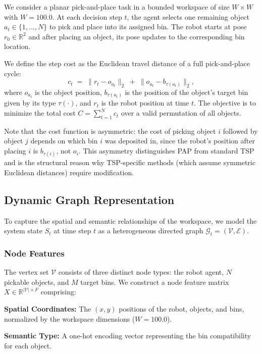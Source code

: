 \documentclass[conference]{IEEEtran}
\begin{document}
We consider a planar pick-and-place task in a bounded workspace of size $W \times W$ with $W = 100.0$. 
At each decision step $t$, the agent selects one remaining object $a_t \in \{1,\dots,N\}$ to pick and place into its assigned bin. 
The robot starts at pose $r_0 \in \mathbb{R}^2$ and after placing an object, its pose updates to the corresponding bin location.

We define the step cost as the Euclidean travel distance of a full pick-and-place cycle:
\begin{equation}
c_t \;=\; \lVert r_t - o_{a_t} \rVert_2 \;+\; \lVert o_{a_t} - b_{\tau(a_t)} \rVert_2,
\end{equation}
where $o_{a_t}$ is the object position, $b_{\tau(a_t)}$ is the position of the object's target bin given by its type $\tau(\cdot)$, and $r_t$ is the robot position at time $t$. 
The objective is to minimize the total cost $C = \sum_{t=1}^{N} c_t$ over a valid permutation of all objects.

Note that the cost function is asymmetric: the cost of picking object $i$ followed by object $j$ depends on which bin $i$ was deposited in, since the robot's position after placing $i$ is $b_{\tau(i)}$, not $o_i$. This asymmetry distinguishes PAP from standard TSP and is the structural reason why TSP-specific methods (which assume symmetric Euclidean distances) require modification.

\subsection{Dynamic Graph Representation}
To capture the spatial and semantic relationships of the workspace, we model the system state $S_t$ at time step $t$ as a heterogeneous directed graph $\mathcal{G}_t = (\mathcal{V}, \mathcal{E})$.

\subsubsection{Node Features}
The vertex set $\mathcal{V}$ consists of three distinct node types: the robot agent, $N$ pickable objects, and $M$ target bins. We construct a node feature matrix $X \in \mathbb{R}^{|\mathcal{V}| \times F}$ comprising:

\textbf{Spatial Coordinates:} The $(x, y)$ positions of the robot, objects, and bins, normalized by the workspace dimensions ($W=100.0$).

\textbf{Semantic Type:} A one-hot encoding vector representing the bin compatibility for each object.
\end{document}

